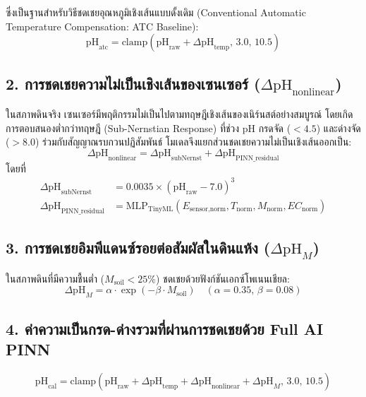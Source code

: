 ซึ่งเป็นฐานสำหรับวิธีชดเชยอุณหภูมิเชิงเส้นแบบดั้งเดิม (Conventional Automatic Temperature Compensation: ATC Baseline):
\begin{equation}
\text{pH}_{\text{atc}} = \text{clamp}(\text{pH}_{\text{raw}} + \Delta \text{pH}_{\text{temp}}, \, 3.0, \, 10.5)
\end{equation}

\subsection{2. การชดเชยความไม่เป็นเชิงเส้นของเซนเซอร์ ($\Delta \text{pH}_{\text{nonlinear}}$)}
ในสภาพดินจริง เซนเซอร์มีพฤติกรรมไม่เป็นไปตามทฤษฎีเชิงเส้นของเนิร์นสต์อย่างสมบูรณ์ โดยเกิดการตอบสนองต่ำกว่าทฤษฎี (Sub-Nernstian Response) ที่ช่วง pH กรดจัด ($< 4.5$) และด่างจัด ($> 8.0$) ร่วมกับสัญญาณรบกวนปฏิสัมพันธ์ โมเดลจึงแยกส่วนชดเชยความไม่เป็นเชิงเส้นออกเป็น:
\begin{equation}
\Delta \text{pH}_{\text{nonlinear}} = \Delta \text{pH}_{\text{subNernst}} + \Delta \text{pH}_{\text{PINN\_residual}}
\label{eq:delta_ph_nonlinear}
\end{equation}
โดยที่
\begin{align}
\Delta \text{pH}_{\text{subNernst}} &= 0.0035 \times (\text{pH}_{\text{raw}} - 7.0)^3 \\
\Delta \text{pH}_{\text{PINN\_residual}} &= \text{MLP}_{\text{TinyML}}\left(E_{\text{sensor,norm}}, T_{\text{norm}}, M_{\text{norm}}, EC_{\text{norm}}\right)
\end{align}

\subsection{3. การชดเชยอิมพีแดนซ์รอยต่อสัมผัสในดินแห้ง ($\Delta \text{pH}_M$)}
ในสภาพดินที่มีความชื้นต่ำ ($M_{\text{soil}} < 25\%$) ชดเชยด้วยฟังก์ชันเอกซ์โพเนนเชียล:
\begin{equation}
\Delta \text{pH}_M = \alpha \cdot \exp(-\beta \cdot M_{\text{soil}}) \quad (\alpha = 0.35, \, \beta = 0.08)
\end{equation}

\subsection{4. ค่าความเป็นกรด-ด่างรวมที่ผ่านการชดเชยด้วย Full AI PINN}
\begin{equation}
\text{pH}_{\text{cal}} = \text{clamp}\left(\text{pH}_{\text{raw}} + \Delta \text{pH}_{\text{temp}} + \Delta \text{pH}_{\text{nonlinear}} + \Delta \text{pH}_M, \, 3.0, \, 10.5\right)
\label{eq:full_pinn_calibrated}
\end{equation}

